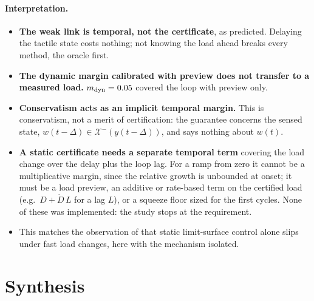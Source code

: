 \documentclass[11pt,a4paper]{article}
\newcommand{\X}{\mathcal X}
\begin{document}
\paragraph{Interpretation.}
\begin{itemize}
    \item \textbf{The weak link is temporal, not the certificate}, as predicted. Delaying the tactile state costs nothing; not knowing the load ahead
    breaks every method, the oracle first.
    \item \textbf{The dynamic margin calibrated with preview does not transfer to a measured load.} $m_{\rm dyn}=0.05$ covered the loop with preview
    only.
    \item \textbf{Conservatism acts as an implicit temporal margin.} This is conservatism, not a merit of certification: the guarantee concerns the
    sensed state, $w(t-\Delta)\in\X^-(y(t-\Delta))$, and says nothing about $w(t)$.
    \item \textbf{A static certificate needs a separate temporal term} covering the load change over the delay plus the loop lag. For a ramp from
    zero it cannot be a multiplicative margin, since the relative growth is unbounded at onset; it must be a load preview, an additive or
    rate-based term on the certified load (e.g.\ $D+\dot D\,L$ for a lag $L$), or a squeeze floor sized for the first cycles. None of these was
    implemented: the study stops at the requirement.
    \item This matches the observation of \citet[§V-C]{costanzo2020two} that static limit-surface control alone slips under fast load changes, here
    with the mechanism isolated.
\end{itemize}

\section{Synthesis}
\label{sec:synthesis}
\end{document}
